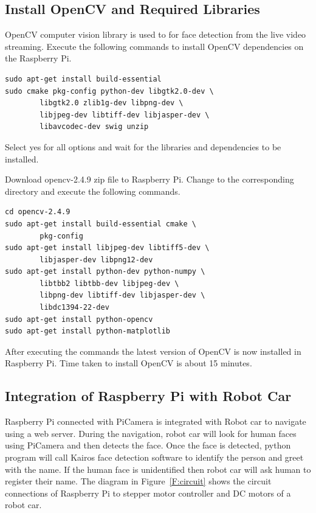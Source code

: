 \subsection{Install OpenCV and Required Libraries}
OpenCV computer vision library is used to for face detection from the live 
video streaming. Execute the following commands to install OpenCV dependencies 
on the Raspberry Pi.

\begin{verbatim}
sudo apt-get install build-essential
sudo cmake pkg-config python-dev libgtk2.0-dev \
		libgtk2.0 zlib1g-dev libpng-dev \
		libjpeg-dev libtiff-dev libjasper-dev \
		libavcodec-dev swig unzip
\end{verbatim}
Select yes for all options and wait for the libraries and dependencies to be 
installed.


Download opencv-2.4.9 zip file to Raspberry Pi. Change to the corresponding 
directory and execute the following commands.

\begin{verbatim}
cd opencv-2.4.9
sudo apt-get install build-essential cmake \
		pkg-config
sudo apt-get install libjpeg-dev libtiff5-dev \
		libjasper-dev libpng12-dev
sudo apt-get install python-dev python-numpy \
		libtbb2 libtbb-dev libjpeg-dev \
		libpng-dev libtiff-dev libjasper-dev \
		libdc1394-22-dev
sudo apt-get install python-opencv
sudo apt-get install python-matplotlib

\end{verbatim}

After executing the commands the latest version of OpenCV is now installed 
in Raspberry Pi. Time taken to install OpenCV is about 15 minutes.

\subsection{Integration of Raspberry Pi with Robot Car}
Raspberry Pi connected with PiCamera is integrated with Robot car to navigate 
using a web server. During the navigation, robot car will look for human 
faces using PiCamera and then detects the face. Once the face is detected, 
python program will call Kairos face detection software to identify the 
person and greet with the name. If the human face is unidentified then robot 
car will ask human to register their name.
The diagram in Figure~\ref{F:circuit} shows the circuit connections of 
Raspberry Pi to stepper motor controller and DC motors of a robot car.

